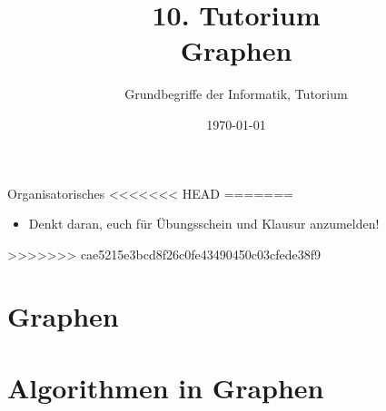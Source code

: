 




\title[Graphen]{10. Tutorium\\ Graphen}
\subtitle{Grundbegriffe der Informatik, Tutorium \hashtag\mytutnumber}
\date{\today}

\usetikzlibrary{matrix}
\usetikzlibrary{arrows.meta}
\usetikzlibrary{automata}
\usetikzlibrary{tikzmark}


\titleframe

\begin{frame}{Organisatorisches}
<<<<<<< HEAD
=======
\begin{itemize}
    \item Denkt daran, euch für Übungsschein und Klausur anzumelden!
\end{itemize}
>>>>>>> cae5215e3bcd8f26c0fe43490450c03cfede38f9
\end{frame}

\roadmap


\section{Graphen}


\section{Algorithmen in Graphen}


